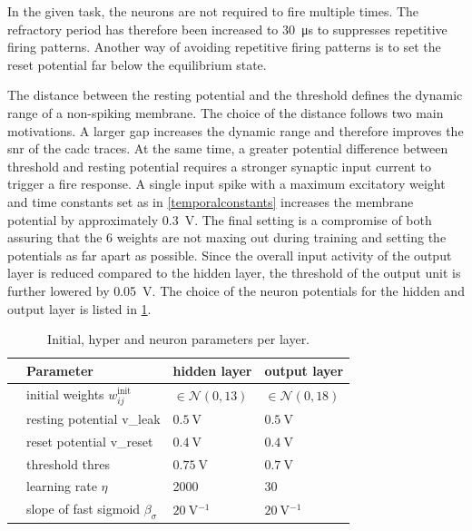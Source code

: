 In the given task, the neurons are not required to fire multiple times. The refractory period has therefore been increased to \SI{30}{\micro \s} to suppresses repetitive firing patterns. Another way of avoiding repetitive firing patterns is to set the reset potential far below the equilibrium state.

The distance between the resting potential and the threshold defines the dynamic range of a non-spiking membrane. The choice of the distance follows two main motivations. A larger gap increases the dynamic range and therefore improves the \gls{snr} of the \gls{cadc} traces. At the same time, a greater potential difference between threshold and resting potential requires a stronger synaptic input current to trigger a fire response. A single input spike with a maximum excitatory weight and time constants set as in \cref{temporalconstants} increases the membrane potential by approximately \SI{0.3}{\V}. The final setting is a compromise of both assuring that the \SI{6}{\bit} weights are not maxing out during training and setting the potentials as far apart as possible. Since the overall input activity of the output layer is reduced compared to the hidden layer, the threshold of the output unit is further lowered by \SI{0.05}{\V}. The choice of the neuron potentials for the hidden and output layer is listed in \cref{initparameters}.

\begin{table}[htb!]\centering{}
	\begin{tabular}{@{}rlll@{}}\toprule
		& Parameter								& 	hidden layer 			& 	output layer \\ \midrule
		& initial weights $w_{ij}^\text{init}$	& 	$\in \mathcal{N}(0,13)$ & 	$\in \mathcal{N}(0,18)$\\
		& resting potential \gls{v_leak}		&	$\SI{0.5}{\V}$ 			& 	$\SI{0.5}{\V}$\\
		& reset potential \gls{v_reset}			&	$\SI{0.4}{\V}$			& 	$\SI{0.4}{\V}$\\
		& threshold \gls{thres} 				&	$\SI{0.75}{\V}$			& 	$\SI{0.7}{\V}$\\
		& learning rate $\eta$ 					&	2000					& 	30			\\
		& slope of fast sigmoid $\beta_\sigma$ 	&	$\SI{20}{\V^{-1}}$		& 	$\SI{20}{\V^{-1}}$	\\
		\bottomrule
	\end{tabular}
	\caption[Initial, hyper and neuron parameters per layer.]{Initial, hyper and neuron parameters per layer.}
	\label{initparameters}
\end{table}

